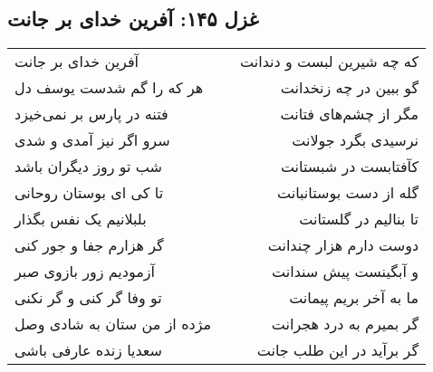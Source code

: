 \begin{center}
\section*{غزل ۱۴۵: آفرین خدای بر جانت}
\label{sec:145}
\begin{longtable}{l p{0.5cm} r}
آفرین خدای بر جانت
&&
که چه شیرین لبست و دندانت
\\
هر که را گم شدست یوسف دل
&&
گو ببین در چه زنخدانت
\\
فتنه در پارس بر نمی‌خیزد
&&
مگر از چشم‌های فتانت
\\
سرو اگر نیز آمدی و شدی
&&
نرسیدی بگرد جولانت
\\
شب تو روز دیگران باشد
&&
کآفتابست در شبستانت
\\
تا کی ای بوستان روحانی
&&
گله از دست بوستانبانت
\\
بلبلانیم یک نفس بگذار
&&
تا بنالیم در گلستانت
\\
گر هزارم جفا و جور کنی
&&
دوست دارم هزار چندانت
\\
آزمودیم زور بازوی صبر
&&
و آبگینست پیش سندانت
\\
تو وفا گر کنی و گر نکنی
&&
ما به آخر بریم پیمانت
\\
مژده از من ستان به شادی وصل
&&
گر بمیرم به درد هجرانت
\\
سعدیا زنده عارفی باشی
&&
گر برآید در این طلب جانت
\\
\end{longtable}
\end{center}
